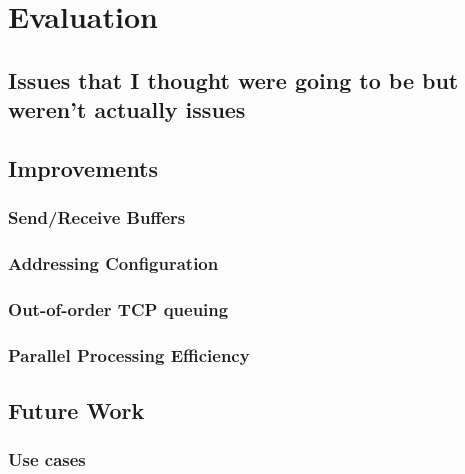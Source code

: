 
\chapter{Evaluation} %
    \section{Issues that I thought were going to be but weren't actually issues}
    \section{Improvements}
        \subsection{Send/Receive Buffers}

        \subsection{Addressing Configuration}
        \subsection{Out-of-order TCP queuing}

        \subsection{Parallel Processing Efficiency}

    \section{Future Work}
        \subsection{Use cases}

